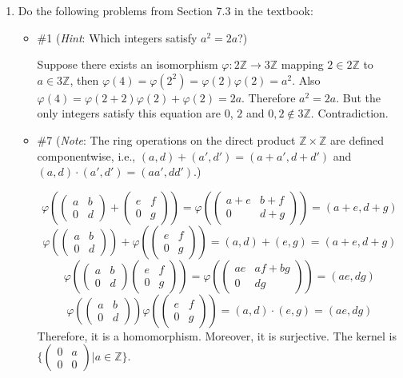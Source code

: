 \documentclass[12pt]{article}
\newcommand{\Z}{\mathbb{Z}}
\begin{document}
\begin{enumerate}
\newpage
\item Do the following problems from Section 7.3 in the textbook:
\begin{itemize}
\item \#1 ({\em Hint}: Which integers satisfy $a^2=2a$?)

Suppose there exists an isomorphism $\varphi: 2 \Z \to 3\Z$ mapping $2 \in 2\Z$ to $a \in 3\Z$, then $\varphi(4) = \varphi(2^2) = \varphi(2)\varphi(2) = a^2$. Also $\varphi(4) = \varphi(2 + 2) \varphi(2) + \varphi(2) = 2a$. Therefore $a^2 = 2a$. But the only integers satisfy this equation are $0$, $2$ and $0, 2 \notin 3\Z$. Contradiction.

\newpage
\item \#7 ({\em Note}: The ring operations on the direct product $\Z\times\Z$ are defined componentwise, i.e., $(a,d)+(a',d')=(a+a',d+d')$ and $(a,d)\cdot(a',d')=(aa',dd')$.)

$$\varphi\left(
\begin{pmatrix}
    a & b\\
    0 & d
\end{pmatrix}+
\begin{pmatrix}
    e & f\\
    0 & g
\end{pmatrix}
\right) = \varphi\left(\begin{pmatrix}
    a+e & b+f\\
    0 & d+g
\end{pmatrix}\right) = (a+e, d+g)
$$
$$
\varphi\left(\begin{pmatrix}
    a & b\\
    0 & d
\end{pmatrix}\right) +
\varphi\left(\begin{pmatrix}
    e & f\\
    0 & g
\end{pmatrix}\right) = (a,d) + (e,g) = (a+e, d+g)
$$
$$
\varphi\left(
\begin{pmatrix}
    a & b\\
    0 & d
\end{pmatrix}
\begin{pmatrix}
    e & f\\
    0 & g
\end{pmatrix}
\right) = \varphi\left(\begin{pmatrix}
    ae & af+bg\\
    0 & dg
\end{pmatrix}\right) = (ae, dg)
$$
$$
\varphi\left(\begin{pmatrix}
    a & b\\
    0 & d
\end{pmatrix}\right)
\varphi\left(\begin{pmatrix}
    e & f\\
    0 & g
\end{pmatrix}\right) = (a,d) \cdot (e,g) = (ae, dg)
$$
Therefore, it is a homomorphism. Moreover, it is surjective. The kernel is $\{\begin{pmatrix} 0 & a\\ 0 & 0 \end{pmatrix} | a \in \Z\}$.


\end{itemize}
\end{enumerate}
\end{document}
